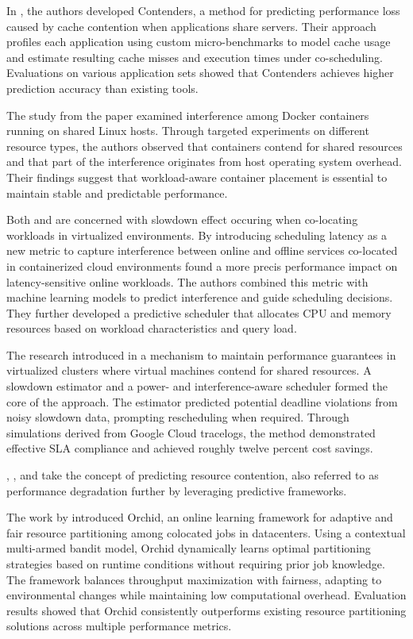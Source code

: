 In \cite{11044815}, the authors developed Contenders, a method for predicting performance loss caused by cache contention when applications share servers. Their approach profiles each application using custom micro-benchmarks to model cache usage and estimate resulting cache misses and execution times under co-scheduling. Evaluations on various application sets showed that Contenders achieves higher prediction accuracy than existing tools.

The study from the paper \cite{8397647} examined interference among Docker containers running on shared Linux hosts. Through targeted experiments on different resource types, the authors observed that containers contend for shared resources and that part of the interference originates from host operating system overhead. Their findings suggest that workload-aware container placement is essential to maintain stable and predictable performance.

Both \cite{10501918} and \cite{6924435} are concerned with slowdown effect occuring when co-locating workloads in virtualized environments.
By introducing scheduling latency as a new metric to capture interference between online and offline services co-located in containerized cloud environments \cite{10501918} found a more precis performance impact on latency-sensitive online workloads. The authors combined this metric with machine learning models to predict interference and guide scheduling decisions. They further developed a predictive scheduler that allocates CPU and memory resources based on workload characteristics and query load.

The research introduced in \cite{6924435} a mechanism to maintain performance guarantees in virtualized clusters where virtual machines contend for shared resources. A slowdown estimator and a power- and interference-aware scheduler formed the core of the approach. The estimator predicted potential deadline violations from noisy slowdown data, prompting rescheduling when required. Through simulations derived from Google Cloud tracelogs, the method demonstrated effective SLA compliance and achieved roughly twelve percent cost savings.

\cite{Chen_2023_3bbb}, \cite{8748923}, \cite{Melo_Alves_2017} and \cite{6468532} take the concept of predicting resource contention, also referred to as performance degradation further by leveraging predictive frameworks.

The work by \cite{Chen_2023_3bbb} introduced Orchid, an online learning framework for adaptive and fair resource partitioning among colocated jobs in datacenters. Using a contextual multi-armed bandit model, Orchid dynamically learns optimal partitioning strategies based on runtime conditions without requiring prior job knowledge. The framework balances throughput maximization with fairness, adapting to environmental changes while maintaining low computational overhead. Evaluation results showed that Orchid consistently outperforms existing resource partitioning solutions across multiple performance metrics.


